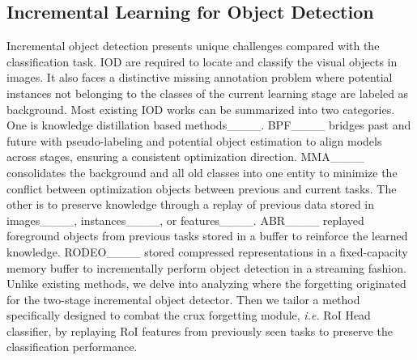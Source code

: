 \subsection{Incremental Learning for Object Detection}
Incremental object detection presents unique challenges compared with the classification task. 
IOD are required to locate and classify the visual objects in images. 
It also faces a distinctive missing annotation problem where potential instances not belonging to the classes of the current learning stage are labeled as background. 
Most existing IOD works can be summarized into two categories. 
One is knowledge distillation based methods____. BPF____ bridges past and future with pseudo-labeling and potential object estimation to align models across stages, ensuring a consistent optimization direction. 
MMA____ consolidates the background and all old classes into one entity to minimize the conflict between optimization objects between previous and current tasks. 
The other is to preserve knowledge through a replay of previous data stored in images____, instances____, or features____. 
ABR____ replayed foreground objects from previous tasks stored in a buffer to reinforce the learned knowledge.  RODEO____ stored compressed representations in a fixed-capacity memory buffer to incrementally perform object detection in a streaming fashion.
Unlike existing methods, we delve into analyzing where the forgetting originated for the two-stage incremental object detector.
Then we tailor a method specifically designed to combat the crux forgetting module, \textit{i.e.} RoI Head classifier, by replaying RoI features from previously seen tasks to preserve the classification performance.
